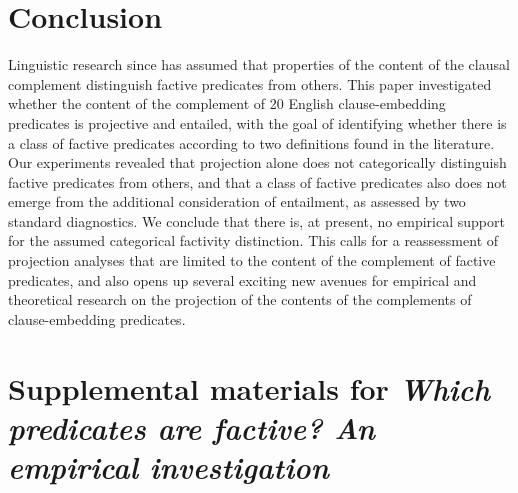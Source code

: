 \documentclass[11pt,fleqn]{article}
\newcommand{\6}{\mbox{$[\hspace*{-.6mm}[$}}
\newcommand{\9}{\mbox{$]\hspace*{-.6mm}]$}}
\begin{document}
\section{Conclusion}\label{s5}

Linguistic research since \citealt{kiparsky-kiparsky70} has assumed that properties of the content of the clausal complement distinguish factive predicates from others. This paper investigated whether the content of the complement of 20 English clause-embedding predicates is projective and entailed, with the goal of identifying whether there is a class of factive predicates according to two definitions found in the literature. Our experiments revealed that projection alone does not categorically distinguish factive predicates from others, and that a class of factive predicates also does not emerge from the additional consideration of entailment, as assessed by two standard diagnostics. We conclude that there is, at present, no empirical support for the assumed categorical factivity distinction. This calls for a reassessment of projection analyses that are limited to the content of the complement of factive predicates, and also opens up several exciting new avenues for empirical and theoretical research on the projection of the contents of the complements of clause-embedding predicates.





\newpage

\section*{Supplemental materials for {\em Which predicates are factive? An empirical investigation}}

\appendix

\setcounter{page}{1}

\setcounter{table}{0}
\renewcommand{\thetable}{A\arabic{table}}

\setcounter{figure}{0}
\renewcommand{\thefigure}{A\arabic{figure}}
\end{document}
